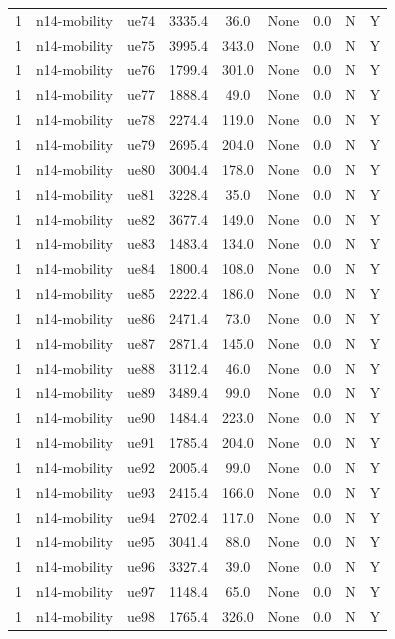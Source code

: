\begin{table}[ht]
\begin{tabular}{|c|c|c|c|c|c|c|c|c|}
1 & n14-mobility & ue74 & 3335.4 & 36.0 & None & 0.0 & N & Y \\
1 & n14-mobility & ue75 & 3995.4 & 343.0 & None & 0.0 & N & Y \\
1 & n14-mobility & ue76 & 1799.4 & 301.0 & None & 0.0 & N & Y \\
1 & n14-mobility & ue77 & 1888.4 & 49.0 & None & 0.0 & N & Y \\
1 & n14-mobility & ue78 & 2274.4 & 119.0 & None & 0.0 & N & Y \\
1 & n14-mobility & ue79 & 2695.4 & 204.0 & None & 0.0 & N & Y \\
1 & n14-mobility & ue80 & 3004.4 & 178.0 & None & 0.0 & N & Y \\
1 & n14-mobility & ue81 & 3228.4 & 35.0 & None & 0.0 & N & Y \\
1 & n14-mobility & ue82 & 3677.4 & 149.0 & None & 0.0 & N & Y \\
1 & n14-mobility & ue83 & 1483.4 & 134.0 & None & 0.0 & N & Y \\
1 & n14-mobility & ue84 & 1800.4 & 108.0 & None & 0.0 & N & Y \\
1 & n14-mobility & ue85 & 2222.4 & 186.0 & None & 0.0 & N & Y \\
1 & n14-mobility & ue86 & 2471.4 & 73.0 & None & 0.0 & N & Y \\
1 & n14-mobility & ue87 & 2871.4 & 145.0 & None & 0.0 & N & Y \\
1 & n14-mobility & ue88 & 3112.4 & 46.0 & None & 0.0 & N & Y \\
1 & n14-mobility & ue89 & 3489.4 & 99.0 & None & 0.0 & N & Y \\
1 & n14-mobility & ue90 & 1484.4 & 223.0 & None & 0.0 & N & Y \\
1 & n14-mobility & ue91 & 1785.4 & 204.0 & None & 0.0 & N & Y \\
1 & n14-mobility & ue92 & 2005.4 & 99.0 & None & 0.0 & N & Y \\
1 & n14-mobility & ue93 & 2415.4 & 166.0 & None & 0.0 & N & Y \\
1 & n14-mobility & ue94 & 2702.4 & 117.0 & None & 0.0 & N & Y \\
1 & n14-mobility & ue95 & 3041.4 & 88.0 & None & 0.0 & N & Y \\
1 & n14-mobility & ue96 & 3327.4 & 39.0 & None & 0.0 & N & Y \\
1 & n14-mobility & ue97 & 1148.4 & 65.0 & None & 0.0 & N & Y \\
1 & n14-mobility & ue98 & 1765.4 & 326.0 & None & 0.0 & N & Y \\

\end{tabular}
\end{table}
